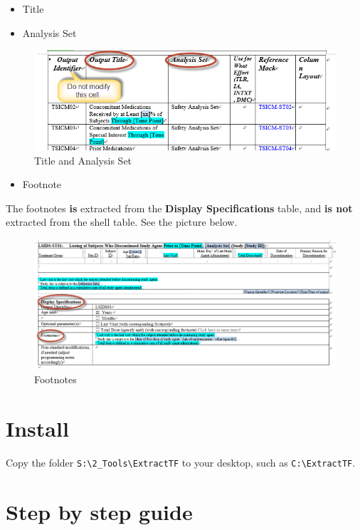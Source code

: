 \documentclass[11pt]{article}
\begin{document}
\begin{itemize}
\item Title
\item Analysis Set
\end{itemize}
\begin{figure}[htbp]
\centering
\includegraphics[width=.9\linewidth]{./images/003.png}
\caption{Title and Analysis Set}
\end{figure}


\begin{itemize}
\item Footnote
\end{itemize}
The footnotes \textbf{is} extracted from the \textbf{Display Specifications} table, and \textbf{is not} extracted from the shell table. See the picture below.
\begin{figure}[htbp]
\centering
\includegraphics[width=.9\linewidth]{./images/004.png}
\caption{Footnotes}
\end{figure}

\section{Install}
\label{sec:org1be2de9}
Copy the folder \texttt{S:\textbackslash{}2\_Tools\textbackslash{}ExtractTF} to your desktop, such as \texttt{C:\textbackslash{}ExtractTF}.

\section{Step by step guide}
\label{sec:org66604bc}
\end{document}
